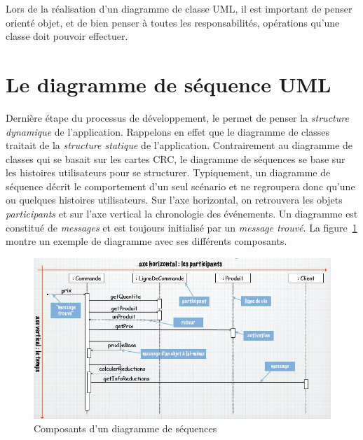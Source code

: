 Lors de la réalisation d'un diagramme de classe UML,
il est important de penser orienté objet,
et de bien penser à toutes les responsabilités,
opérations qu'une classe doit pouvoir effectuer.

\section{Le diagramme de séquence UML}
Dernière étape du processus de développement,
le  permet de penser
la \emph{structure dynamique} de l'application.
Rappelons en effet que le diagramme de classes traitait
de la \emph{structure statique} de l'application.
Contrairement au diagramme de classes qui se basait sur les cartes CRC,
le diagramme de séquences se base sur les histoires
utilisateurs pour se structurer.
Typiquement, un diagramme de séquence décrit le comportement d'un
seul scénario et ne regroupera donc qu'une ou quelques histoires utilisateurs.
Sur l'axe horizontal,
on retrouvera les objets \emph{participants} et sur
l'axe vertical la chronologie des événements.
Un diagramme est constitué de \emph{messages} et
est toujours initialisé par un \emph{message trouvé}.
La figure~\ref{diagramme_sequences} montre un
exemple de diagramme avec ses différents composants.

\begin{figure}[h]
  \centering
  \hspace*{-0.25cm}
  \includegraphics[scale=0.75]{diagramme_sequences.jpg}
  \caption{Composants d'un diagramme de séquences}
  \label{diagramme_sequences}
\end{figure}

